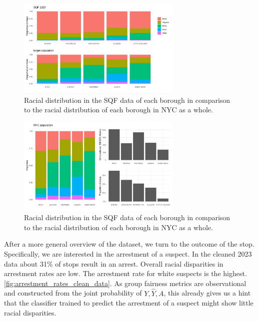 \begin{figure}
    \centering
    \includegraphics[width=0.7\textwidth]{../figures/sqf_case_study_plot11.png}
    \caption{Racial distribution in the SQF data of each borough in comparison to the racial distribution of each borough in NYC as a whole.}
    \label{fig:racial_distribution_borough}
\end{figure}
\begin{figure}
    \centering
    \includegraphics[width=0.7\textwidth]{../figures/sqf_case_study_plot14.png}
    \caption{Racial distribution in the SQF data of each borough in comparison to the racial distribution of each borough in NYC as a whole.}
    \label{fig:nyc_pop_crimerates_stops_comparison}
\end{figure}

After a more general overview of the dataset, we turn to the outcome of the stop. Specifically, we are interested in the arrestment of a suspect. In the cleaned 2023 data about 31\% of stops result in an arrest.
Overall racial disparities in arrestment rates are low. The arrestment rate for white suspects is the highest. \autoref{fig:arrestment_rates_clean_data}. As group fairness metrics are observational and constructed from the joint probability of $Y, \hat{Y}, A$, this already gives us a hint that the classifier trained to predict the arrestment of a suspect might show little racial disparities.

